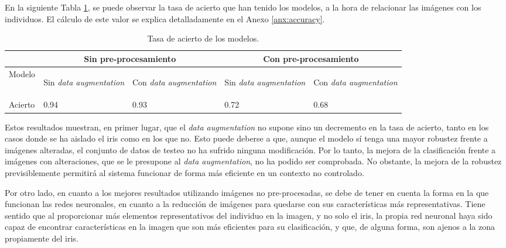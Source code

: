 En la siguiente Tabla \ref{tabla:tasa-acierto-modelos}, se puede observar la tasa de acierto que han tenido los modelos, a la hora de relacionar las imágenes
 con los individuos. El cálculo de este valor se explica detalladamente en el Anexo \ref{anx:accuracy}.

\begin{table}[h!]
\begin{tabular}{ |p{1.2cm}||p{2.3cm}|p{2.3cm}|p{2.3cm}|p{2.3cm}|  }
    \hline
     & \multicolumn{2}{|c|}{Sin pre-procesamiento} & \multicolumn{2}{|c|}{Con pre-procesamiento} \\
    \hline
    Modelo& \begin{footnotesize}Sin \textit{data \newline augmentation}\end{footnotesize} & \begin{footnotesize}Con \textit{data \newline augmentation}\end{footnotesize} & \begin{footnotesize}Sin \textit{data \newline augmentation}\end{footnotesize}& \begin{footnotesize}Con \textit{data \newline augmentation}\end{footnotesize}\\
    \hline
    Acierto & 0.94   & 0.93    & 0.72 &   0.68\\
    \hline
   \end{tabular}
   \caption{\label{tabla:tasa-acierto-modelos}Tasa de acierto de los modelos.}
\end{table}


Estos resultados muestran, en primer lugar, que el \textit{data augmentation} no supone sino un decremento en la tasa de acierto, tanto en los casos donde se ha aislado el iris
como en los que no. Esto puede deberse a que, aunque el modelo sí tenga una mayor robustez frente a imágenes alteradas, el conjunto de datos de testeo no ha sufrido ninguna modificación.
Por lo tanto, la mejora de la clasificación frente a imágenes con alteraciones, que se le presupone al \textit{data augmentation}, no ha podido ser comprobada. No obstante, la mejora de la robustez previsiblemente
permitirá al sistema funcionar de forma más eficiente en un contexto no controlado.

Por otro lado, en cuanto a los mejores resultados utilizando imágenes no pre-procesadas, se debe de tener en cuenta la forma en la que funcionan las redes neuronales,
en cuanto a la reducción de imágenes para quedarse con sus características más representativas. Tiene sentido que al proporcionar más elementos representativos del individuo en la imagen,
y no solo el iris, la propia red neuronal haya sido capaz de encontrar características en la imagen que son más eficientes para su clasificación, y que, de alguna forma, son
ajenos a la zona propiamente del iris.

